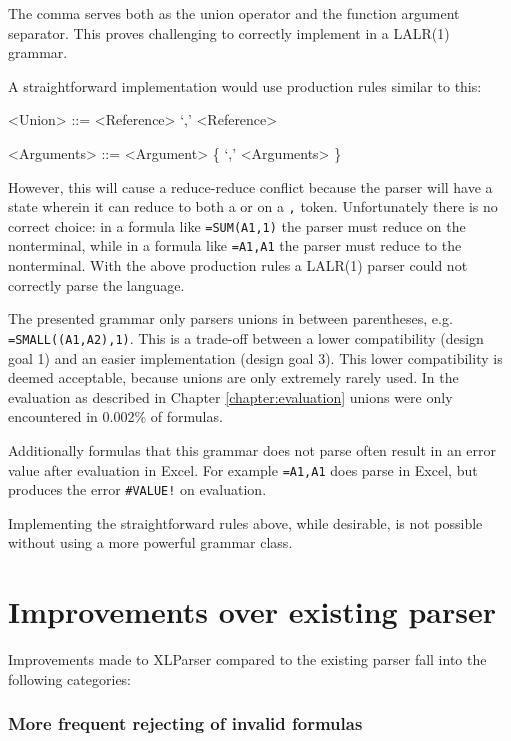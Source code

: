 The comma serves both as the union operator and the function argument separator.
This proves challenging to correctly implement in a LALR(1) grammar.

\noindent A straightforward implementation would use production rules similar to this:
\begin{grammar}
<Union> ::= <Reference> `,' <Reference>

<Arguments> ::= <Argument> \{ `,' <Arguments> \}
\end{grammar}

However, this will cause a reduce-reduce conflict because the parser will have a state wherein it can reduce to both a  or  on a \texttt{,} token.
Unfortunately there is no correct choice: in a formula like \texttt{=SUM(A1,1)} the parser must reduce on the  nonterminal, while in a formula like \texttt{=A1,A1} the parser must reduce to the  nonterminal.
With the above production rules a LALR(1) parser could not correctly parse the language.

The presented grammar only parsers unions in between parentheses, e.g. \texttt{=SMALL((A1,A2),1)}.
This is a trade-off between a lower compatibility (design goal 1) and an easier implementation (design goal 3).
This lower compatibility is deemed acceptable, because unions are only extremely rarely used.
In the evaluation as described in Chapter \ref{chapter:evaluation} unions were only encountered in 0.002\% of formulas.

Additionally formulas that this grammar does not parse often result in an error value after evaluation in Excel.
For example \texttt{=A1,A1} does parse in Excel, but produces the error \texttt{\#VALUE!} on evaluation.

Implementing the straightforward rules above, while desirable, is not possible without using a more powerful grammar class.

\newpage

\section{Improvements over existing parser}

Improvements made to XLParser compared to the existing parser fall into the following categories:

\subsubsection{More frequent rejecting of invalid formulas}

